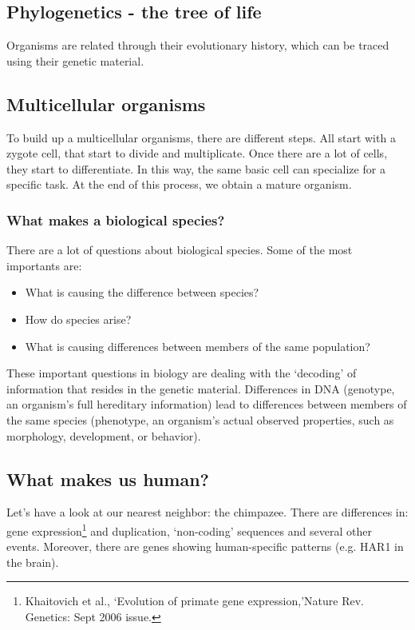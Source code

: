 \subsection{Phylogenetics - the tree of life}

Organisms are related through their evolutionary history, which can be traced 
using their genetic material.

\subsection{Multicellular organisms}

To build up a multicellular organisms, there are different steps. All start with 
a zygote cell, that start to divide and multiplicate. Once there are a lot of 
cells, they start to differentiate. In this way, the same basic cell can 
specialize for a specific task. At the end of this process, we obtain a mature 
organism.

\subsubsection{What makes a biological species?}

There are a lot of questions about biological species. Some of the most importants 
are:
\begin{itemize}
\item What is causing the difference between species?
\item How do species arise?
\item What is causing differences between members of the same population?
\end{itemize}

These important questions in biology are dealing with the `decoding' of information 
that resides in the genetic material. Differences in DNA (genotype, an organism's 
full hereditary information) lead to differences between members of the same 
species (phenotype, an organism's actual observed properties, such as morphology, 
development, or behavior).

\subsection{What makes us human?}

Let's have a look at our nearest neighbor: the chimpazee. There are differences 
in: gene expression\footnote{Khaitovich et al., `Evolution of primate gene 
expression,'Nature Rev. Genetics: Sept 2006 issue.} and duplication, `non-coding' 
sequences and several other events. Moreover, there are genes showing 
human-specific patterns (e.g. HAR1 in the brain).

